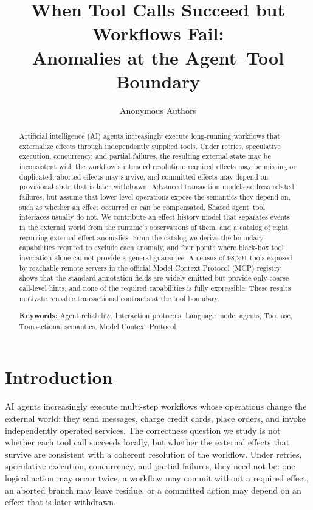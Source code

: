 \documentclass[runningheads]{comsis3}
\title{When Tool Calls Succeed but Workflows Fail:\\
Anomalies at the Agent--Tool Boundary}
\author{Anonymous Authors}
\institute{Affiliations withheld for anonymous review}
\begin{document}
\maketitle

\begin{abstract}
Artificial intelligence (AI) agents increasingly execute long-running
workflows that externalize effects through independently supplied tools.
Under retries, speculative execution, concurrency, and partial failures,
the resulting external state may be inconsistent with the workflow's
intended resolution: required effects may be missing or duplicated,
aborted effects may survive, and committed effects may depend on
provisional state that is later withdrawn. Advanced transaction models
address related failures, but assume that lower-level operations expose
the semantics they depend on, such as whether an effect occurred or can be
compensated. Shared agent--tool interfaces usually do not. We contribute
an effect-history model that separates events in the external world from
the runtime's observations of them, and a catalog of eight recurring
external-effect anomalies. From the catalog we derive the boundary
capabilities required to exclude each anomaly, and four points where
black-box tool invocation alone cannot provide a general guarantee. A
census of 98{,}291 tools exposed by reachable remote servers in the
official Model Context Protocol (MCP) registry shows that the standard
annotation fields are widely emitted but provide only coarse call-level
hints, and none of the required capabilities is fully expressible. These
results motivate reusable transactional contracts at the tool boundary.

\vspace{6pt}\textbf{Keywords:} Agent reliability, Interaction protocols, Language model agents, Tool use, Transactional semantics, Model Context Protocol.
\end{abstract}

\section{Introduction}

AI agents increasingly execute multi-step workflows whose operations
change the external world: they send messages, charge credit cards, place
orders, and invoke independently operated services. The correctness question
we study is not whether each tool call succeeds locally, but whether the
external effects that survive are consistent with a coherent resolution of
the workflow. Under retries, speculative execution,
concurrency, and partial failures, they need not be: one logical action may
occur twice, a workflow may commit without a required effect, an aborted
branch may leave residue, or a committed action may depend on an effect
that is later withdrawn.
\end{document}
